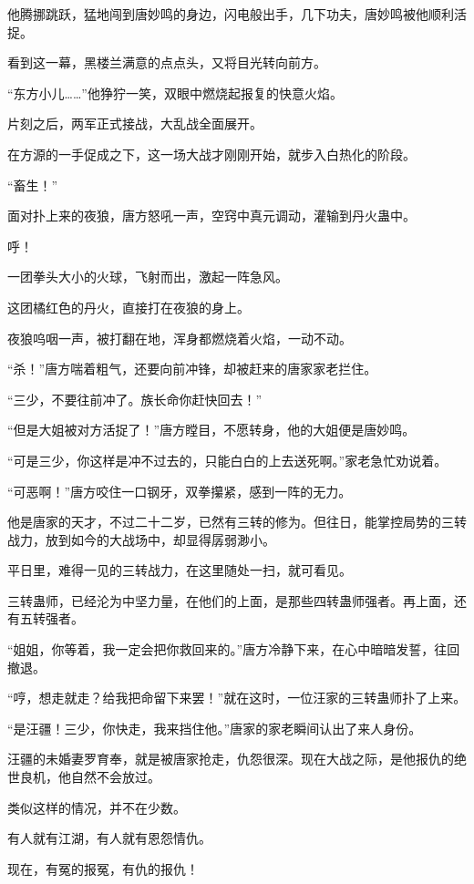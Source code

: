 \begin{this_body}
他腾挪跳跃，猛地闯到唐妙鸣的身边，闪电般出手，几下功夫，唐妙鸣被他顺利活捉。

看到这一幕，黑楼兰满意的点点头，又将目光转向前方。

“东方小儿……”他狰狞一笑，双眼中燃烧起报复的快意火焰。

片刻之后，两军正式接战，大乱战全面展开。

在方源的一手促成之下，这一场大战才刚刚开始，就步入白热化的阶段。

“畜生！”

面对扑上来的夜狼，唐方怒吼一声，空窍中真元调动，灌输到丹火蛊中。

呼！

一团拳头大小的火球，飞射而出，激起一阵急风。

这团橘红色的丹火，直接打在夜狼的身上。

夜狼呜咽一声，被打翻在地，浑身都燃烧着火焰，一动不动。

“杀！”唐方喘着粗气，还要向前冲锋，却被赶来的唐家家老拦住。

“三少，不要往前冲了。族长命你赶快回去！”

“但是大姐被对方活捉了！”唐方瞠目，不愿转身，他的大姐便是唐妙鸣。

“可是三少，你这样是冲不过去的，只能白白的上去送死啊。”家老急忙劝说着。

“可恶啊！”唐方咬住一口钢牙，双拳攥紧，感到一阵的无力。

他是唐家的天才，不过二十二岁，已然有三转的修为。但往日，能掌控局势的三转战力，放到如今的大战场中，却显得孱弱渺小。

平日里，难得一见的三转战力，在这里随处一扫，就可看见。

三转蛊师，已经沦为中坚力量，在他们的上面，是那些四转蛊师强者。再上面，还有五转强者。

“姐姐，你等着，我一定会把你救回来的。”唐方冷静下来，在心中暗暗发誓，往回撤退。

“哼，想走就走？给我把命留下来罢！”就在这时，一位汪家的三转蛊师扑了上来。

“是汪疆！三少，你快走，我来挡住他。”唐家的家老瞬间认出了来人身份。

汪疆的未婚妻罗育奉，就是被唐家抢走，仇怨很深。现在大战之际，是他报仇的绝世良机，他自然不会放过。

类似这样的情况，并不在少数。

有人就有江湖，有人就有恩怨情仇。

现在，有冤的报冤，有仇的报仇！

\end{this_body}

